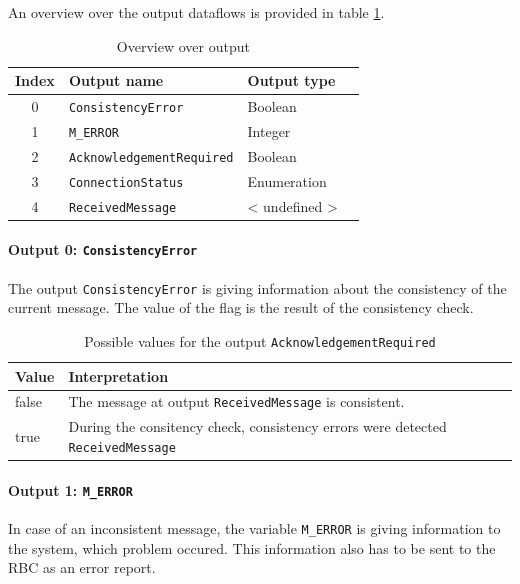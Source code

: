 \documentclass{template/openetcs_report}
\begin{document}
An overview over the output dataflows is provided in table \ref{tbl:ReceiveMessageAndCheckConsistencyOutput}.

\begin{table}[H]
  \begin{tabular}{| c | l | l | l |}
    \hline
    \textbf{Index} & \textbf{Output name} & \textbf{Output type}\\ \hline
    0 & \texttt{ConsistencyError} & Boolean\\
    1 & \texttt{M\_ERROR} & Integer\\
    2 & \texttt{AcknowledgementRequired} & Boolean\\
    3 & \texttt{ConnectionStatus} & Enumeration\\
    4 & \texttt{ReceivedMessage} & < undefined > \\
    \hline
  \end{tabular} 
  \caption{Overview over output}
  \label{tbl:ReceiveMessageAndCheckConsistencyOutput}
\end{table}

\paragraph{Output 0: \texttt{ConsistencyError}}

The output \texttt{ConsistencyError} is giving information about the consistency of the current message. The value of the flag is the result of the consistency check.

\begin{table}[H]
  \begin{tabular}{| l | p{13cm} |}
    \hline
    \textbf{Value} & \textbf{Interpretation}\\ \hline
    false & The message at output \texttt{ReceivedMessage} is consistent. \\
    true & During the consitency check, consistency errors were detected \texttt{ReceivedMessage} \\
    \hline
  \end{tabular} 
  \caption{Possible values for the output \texttt{AcknowledgementRequired}}
  \label{tbl:AcknowledgementRequiredTable}
\end{table}

\paragraph{Output 1: \texttt{M\_ERROR}}
In case of an inconsistent message, the variable \texttt{M\_ERROR} is giving information to the system, which problem occured. This information also has to be sent to the RBC as an error report.
\end{document}
